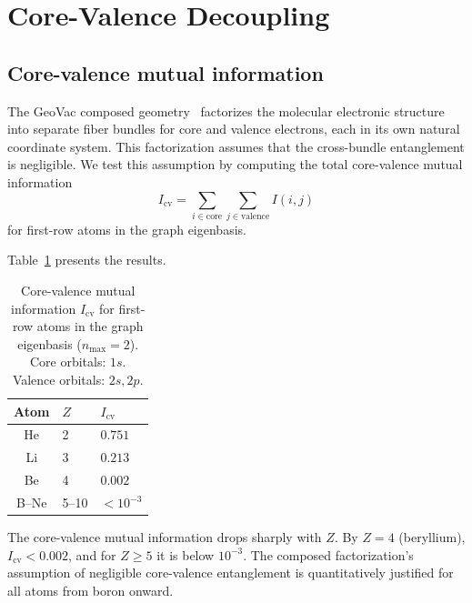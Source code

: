 \documentclass[twocolumn,pra,amsmath,amssymb,superscriptaddress]{revtex4-2}
\begin{document}
\section{Core-Valence Decoupling}
\label{sec:corevalence}

\subsection{Core-valence mutual information}

The GeoVac composed geometry~\cite{GeoVac_Paper17} factorizes the
molecular electronic structure into separate fiber bundles for
core and valence electrons, each in its own natural coordinate
system.  This factorization assumes that the cross-bundle
entanglement is negligible.  We test this assumption by computing
the total core-valence mutual information
\begin{equation}
  I_{\text{cv}} = \sum_{i \in \text{core}} \sum_{j \in \text{valence}}
  I(i, j)
  \label{eq:icv}
\end{equation}
for first-row atoms in the graph eigenbasis.

Table~\ref{tab:corevalence} presents the results.

\begin{table}
\caption{Core-valence mutual information $I_{\text{cv}}$ for
first-row atoms in the graph eigenbasis ($n_{\max} = 2$).  Core
orbitals: $1s$.  Valence orbitals: $2s, 2p$.
\label{tab:corevalence}}
\begin{ruledtabular}
\begin{tabular}{cll}
Atom & $Z$ & $I_{\text{cv}}$ \\
\hline
He & 2 & $0.751$ \\
Li & 3 & $0.213$ \\
Be & 4 & $0.002$ \\
B--Ne & 5--10 & $< 10^{-3}$ \\
\end{tabular}
\end{ruledtabular}
\end{table}

The core-valence mutual information drops sharply with $Z$.  By
$Z = 4$ (beryllium), $I_{\text{cv}} < 0.002$, and for $Z \geq 5$
it is below $10^{-3}$.  The composed factorization's assumption
of negligible core-valence entanglement is quantitatively justified
for all atoms from boron onward.
\end{document}
